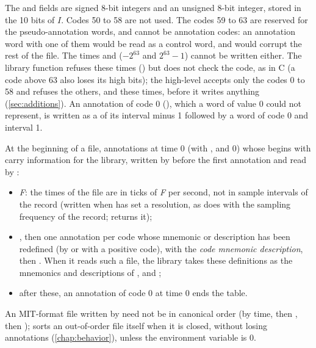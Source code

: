 The  and  fields are signed 8-bit integers and  an
unsigned 8-bit integer, stored in the 10 bits of $I$. Codes 50 to 58 are not used. The
codes 59 to 63 are reserved for the pseudo-annotation words, and cannot be annotation
codes: an annotation word with one of them would be read as a control word, and would
corrupt the rest of the file. The times  and 
($-2^{63}$ and $2^{63}-1$) cannot be written either. The library function 
refuses these times () but does not check the code, as in C (a code
above 63 also loses its high bits); the high-level  accepts only
the codes 0 to 58 and refuses the others, and these times, before it writes anything
(\cref{sec:additions}). An annotation of code 0 (), which a word of value 0 could not represent, is
written as a  of its interval minus 1 followed by a word of code 0 and interval
1.

At the beginning of a file,  annotations at time 0 (with ,
 and  0) whose  begins with \code{\#\#} carry information
for the library, written by  before the first annotation and read by
:
\begin{itemize}
\item {}\textit{F}: the times of the file are in ticks of
  \textit{F} per second, not in sample intervals of the record (written when
   has set a resolution, as  does with the sampling frequency of
  the record;  returns it);
\item {}, then one annotation per code whose mnemonic
  or description has been redefined (by  or  with a
  positive code), with the  \textit{code mnemonic description}, then
  . When it reads such a file, the library takes these
  definitions as the mnemonics and descriptions of ,  and
  ;
\item after these, an annotation of code 0 at time 0 ends the table.
\end{itemize}

An MIT-format file written by  need not be in canonical order (by time, then
, then ); \wfdbx{} sorts an out-of-order file itself when it is closed,
without losing annotations (\cref{chap:behavior}), unless the environment variable
 is 0.

